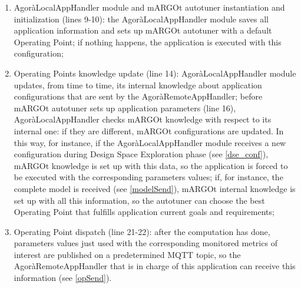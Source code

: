 \begin{enumerate}

    \item AgoràLocalAppHandler module and mARGOt autotuner instantiation and initialization (lines 9-10): the AgoràLocalAppHandler module saves all application information and sets up mARGOt autotuner with a default Operating Point; if nothing happens, the application is executed with this configuration;
    
    \item Operating Points knowledge update (line 14): AgoràLocalAppHandler module updates, from time to time, its internal knowledge about application configurations that are sent by the AgoràRemoteAppHandler; before mARGOt autotuner sets up application parameters (line 16), AgoràLocalAppHandler checks mARGOt knowledge with respect to its internal one: if they are different, mARGOt configurations are updated. In this way, for instance, if the AgoràLocalAppHandler module receives a new configuration during Design Space Exploration phase (see \ref{dse_conf}), mARGOt knowledge is set up with this data, so the application is forced to be executed with the corresponding parameters values; if, for instance, the complete model is received (see \ref{modelSend}), mARGOt internal knowledge is set up with all this information, so the autotuner can choose the best Operating Point that fulfills application current goals and requirements;
    
    \item Operating Point dispatch (line 21-22): after the computation has done, parameters values just used with the corresponding monitored metrics of interest are published on a predetermined MQTT topic, so the AgoràRemoteAppHandler that is in charge of this application can receive this information (see \ref{opSend}).
    
\end{enumerate}
